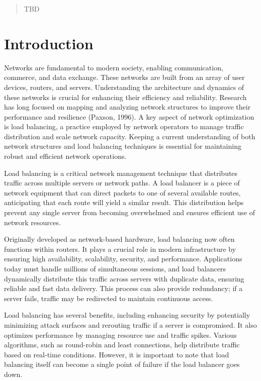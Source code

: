 \documentclass[12pt]{cwru_thesis}
\begin{document}
\printnomenclature

\begin{abstract}
  TBD
\end{abstract}

\mainmatter

\setcounter{secnumdepth}{2}

\chapter{Introduction} 
\label{chap:intro}
Networks are fundamental to modern society, enabling communication, commerce, and data exchange. These networks are built from an array of user devices, routers, and servers. Understanding the architecture and dynamics of these networks is crucial for enhancing their efficiency and reliability. Research has long focused on mapping and analyzing network structures to improve their performance and resilience (Paxson, 1996). A key aspect of network optimization is load balancing, a practice employed by network operators to manage traffic distribution and scale network capacity. Keeping a current understanding of both network structures and load balancing techniques is essential for maintaining robust and efficient network operations.

Load balancing is a critical network management technique that distributes traffic across multiple servers or network paths. A load balancer is a piece of network equipment that can direct packets to one of several available routes, anticipating that each route will yield a similar result. This distribution helps prevent any single server from becoming overwhelmed and ensures efficient use of network resources.

Originally developed as network-based hardware, load balancing now often functions within routers. It plays a crucial role in modern infrastructure by ensuring high availability, scalability, security, and performance. Applications today must handle millions of simultaneous sessions, and load balancers dynamically distribute this traffic across servers with duplicate data, ensuring reliable and fast data delivery. This process can also provide redundancy; if a server fails, traffic may be redirected to maintain continuous access.

Load balancing has several benefits, including enhancing security by potentially minimizing attack surfaces and rerouting traffic if a server is compromised. It also optimizes performance by managing resource use and traffic spikes. Various algorithms, such as round-robin and least connections, help distribute traffic based on real-time conditions. However, it is important to note that load balancing itself can become a single point of failure if the load balancer goes down.
\end{document}
